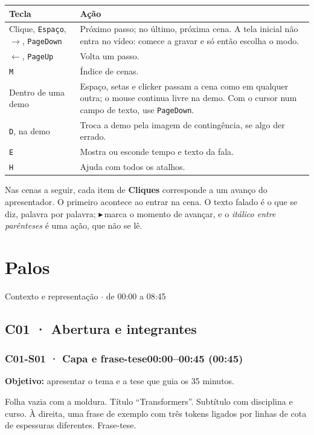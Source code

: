 \documentclass[11pt,a4paper]{article}
\newcommand{\rotulo}[1]{\par\vspace{3pt}\noindent{\small\bfseries\color{grafite}\MakeUppercase{#1}}\par\nopagebreak}
\newcommand{\cena}[3]{\subsubsection[#1 · #2]{#1 · #2\hfill{\normalfont\small\ttfamily\color{grafite}#3}}}
\newcommand{\clique}{\colorbox{azul}{\color{white}\scriptsize$\blacktriangleright$}\,}
\begin{document}
\begin{tabularx}{\linewidth}{lX}
\toprule
\textbf{Tecla} & \textbf{Ação} \\
\midrule
Clique, \texttt{Espaço}, $\rightarrow$, \texttt{PageDown} & Próximo passo; no último, próxima cena. A tela inicial não entra no vídeo: comece a gravar e só então escolha o modo. \\
$\leftarrow$, \texttt{PageUp} & Volta um passo. \\
\texttt{M} & Índice de cenas. \\
Dentro de uma demo & Espaço, setas e clicker passam a cena como em qualquer outra; o mouse continua livre na demo. Com o cursor num campo de texto, use \texttt{PageDown}. \\
\texttt{D}, na demo & Troca a demo pela imagem de contingência, se algo der errado. \\
\texttt{E} & Mostra ou esconde tempo e texto da fala. \\
\texttt{H} & Ajuda com todos os atalhos. \\
\bottomrule
\end{tabularx}

Nas cenas a seguir, cada item de \textbf{Cliques} corresponde a um avanço do apresentador. O primeiro acontece ao entrar na cena. O texto falado é o que se diz, palavra por palavra; \clique{}marca o momento de avançar, e o \emph{itálico entre parênteses} é uma ação, que não se lê.
\clearpage
\section{Palos}
{\small\ttfamily\color{grafite}Contexto e representação $\cdot$ de 00:00 a 08:45\par}
\subsection{C01 · Abertura e integrantes}
\cena{C01-S01}{Capa e frase-tese}{00:00--00:45 (00:45)}
\textbf{Objetivo:} apresentar o tema e a tese que guia os 35 minutos.\par
\rotulo{Na tela}
Folha vazia com a moldura. Título “Transformers”. Subtítulo com disciplina e curso. À direita, uma frase de exemplo com três tokens ligados por linhas de cota de espessuras diferentes. Frase-tese.
\end{document}
